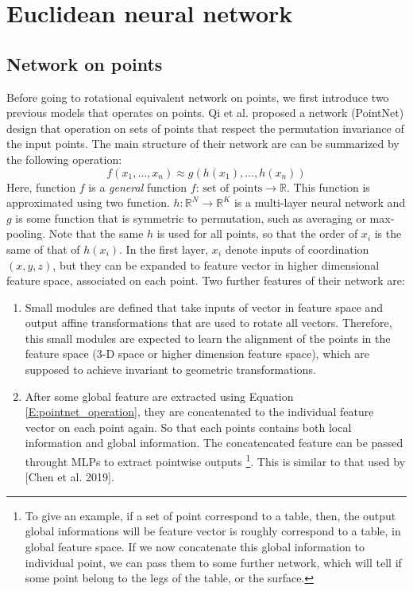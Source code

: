 \documentclass{IEEEtran}
\begin{document}
\section{Euclidean neural network}
\subsection*{Network on points}
Before going to rotational equivalent network on points, we first introduce two previous models that operates 
on points. Qi et al.\cite{qi_pointnet_2017} proposed a network (PointNet) design that operation on sets of points that respect 
the permutation invariance of the input points. The main structure of their network are can be summarized by 
the following operation:
\begin{equation}
    f({x_1,\dots,x_n}) \approx g(h(x_1),\dots,h(x_n)) \label{E:pointnet_operation}
\end{equation}
Here, function $f$ is a \emph{general} function $f\colon\, \text{set of points} \to \mathbb{R}$. This function 
is approximated using two function. $h\colon \mathbb{R}^N\to \mathbb{R}^K $ is a multi-layer neural network
and $g$ is some function that is symmetric to permutation, such as averaging or max-pooling. Note that the same 
$h$ is used for all points, so that the order of $x_i$ is the same of that of $h(x_i)$. 
In the first layer, $x_i$ denote inputs of coordination $(x,y,z)$, but they can be expanded to feature vector 
in higher dimensional feature space, associated on each point.
Two further features of their network are:
\begin{enumerate}
    \item Small modules are defined that take inputs of vector in feature space and output affine transformations that are used to 
            rotate all vectors. Therefore, this small modules are expected to learn the alignment of the points in the feature space 
            (3-D space or higher dimension feature space), which 
            are supposed to achieve invariant to geometric transformations.
    \item After some global feature are extracted using Equation \eqref{E:pointnet_operation}, they are concatenated to the individual
            feature vector on each point again. So that each points contains both local information and global information. The concatencated 
            feature can be passed throught MLPs to extract pointwise outputs
            \footnote{To give an example, if a set of point correspond to a table, then, the output global informations will be feature vector 
            is roughly correspond to a table, in global feature space. If we now concatenate this global information to individual point, we 
            can pass them to some further network, which will tell if some point belong to the legs of the table, or the surface.}. 
            This is similar to that used by [Chen et al. 2019].
\end{enumerate}
\end{document}
